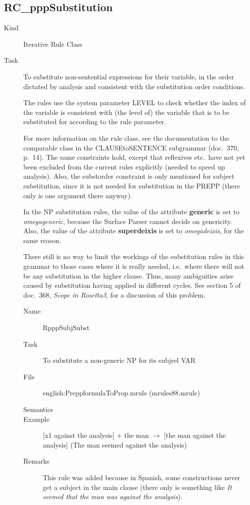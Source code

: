 \newpage
\subsection{RC\_pppSubstitution}
\begin{description}
\item[Kind] Iterative Rule Class
\item[Task] To substitute non-sentential expressions for their variable, in the 
order dictated by analysis and consistent with the substitution order 
conditions.

The rules use the system parameter LEVEL to check whether the index of the 
variable is consistent with (the level of) the variable that is to be 
substituted for according to the rule parameter.

For more information on the rule class, see the documentation to the comparable 
class in the CLAUSEtoSENTENCE subgrammar (doc.\ 370, p.\ 14). The same 
constraints hold, except that reflexives etc.\ have not yet been excluded from 
the current rules explicitly (needed to speed up analysis). 
Also, the substorder constraint is only mentioned 
for subject substitution, since it is not needed for substitution in the PREPP 
(there only is one argument there anyway).

In the NP substitution rules, the value of the attribute {\bf generic} is set 
to {\em omegageneric\/}, because the Surface Parser cannot decide on genericity.
Also, the value of the attribute {\bf superdeixis} is set to {\em 
omegadeixis\/}, for the same reason.

There still is no way to limit the workings of the substitution rules in this 
grammar to those cases where it is really needed, i.e.\ where there will not be 
any substitution in the higher clause. Thus, many ambiguities arise caused by
substitution having applied in different cycles. See section 5 of doc.\ 368, 
{\em Scope in Rosetta3\/}, for a discussion of this problem.

\vspace{1 cm}
\begin{description}
\item[Name] RpppSubjSubst
\item[Task] To substitute a non-generic NP for its subjrel VAR
\item[File] english:PreppformulaToProp.mrule (mrules88.mrule)
\item[Semantics]
\item[Example] [x1 against the analysis] + the man $\rightarrow$ [the man 
against the analysis] (The man seemed against the analysis)
\item[Remarks] This rule was added because in Spanish, some constructions never 
get a subject in the main clause (there only is something like {\em It seemed 
that the man was against the analysis\/}).


\end{description}
\end{description}
